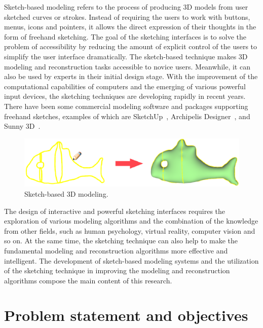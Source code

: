 Sketch-based modeling refers to the process  of producing 3D models
from user sketched curves or strokes. Instead of requiring the users
to work with buttons, menus, icons and pointers, it allows the
direct expression of their thoughts in the form of freehand
sketching. The goal of the sketching interfaces is to solve the
problem of accessibility by reducing the amount of explicit control
of the users to simplify the user interface dramatically. The
sketch-based technique makes 3D modeling and reconstruction tasks
accessible to novice users. Meanwhile, it can also be used by
experts in their initial design stage. With the improvement of the
computational capabilities of computers and the emerging of various
powerful input devices, the sketching techniques are developing
rapidly in recent years. There have been some commercial modeling
software and packages supporting freehand sketches, examples of
which are SketchUp~\cite{SketchUp}, Archipelis
Designer~\cite{ArcDes}, and Sunny 3D~\cite{Sunny3D}.

\begin{figure} [htbp]
    \centering
  \includegraphics[scale=0.6]{figs/f1.sketch.eps}
  \caption{Sketch-based 3D modeling.}
\end{figure}

The design of interactive and  powerful sketching interfaces
requires the exploration of various modeling algorithms and the
combination of the knowledge from other fields, such as human
psychology, virtual reality, computer vision and so on. At the same
time, the sketching technique can also help to make the fundamental
modeling and reconstruction algorithms more effective and
intelligent. The development of sketch-based modeling systems and
the utilization of the sketching technique in improving the modeling
and reconstruction algorithms compose the main content of this
research.


\section{Problem statement and objectives}


